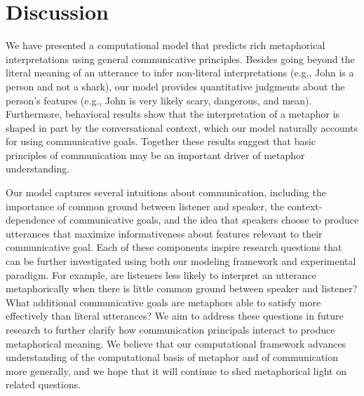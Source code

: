 \documentclass[10pt,letterpaper]{article}
\begin{document}
\section{Discussion}
We have presented a computational model that predicts rich metaphorical interpretations using general communicative principles. Besides going beyond the literal meaning of an utterance to infer non-literal interpretations (e.g., John is a person and not a shark), our model provides quantitative judgments about the person's features (e.g., John is very likely scary, dangerous, and mean). Furthermore, behavioral results show that the interpretation of a metaphor is shaped in part by the conversational context, which our model naturally accounts for using communicative goals. Together these results suggest that basic principles of communication may be an important driver of metaphor understanding.

Our model captures several intuitions about communication, including the importance of common ground between listener and speaker, the context-dependence of communicative goals, and the idea that speakers choose to produce utterances that maximize informativeness about features relevant to their communicative goal. Each of these components inspire research questions that can be further investigated using both our modeling framework and experimental paradigm. For example, are listeners less likely to interpret an utterance metaphorically when there is little common ground between speaker and listener? What additional communicative goals are metaphors able to satisfy more effectively than literal utterances? We aim to address these questions in future research to further clarify how communication principals interact to produce metaphorical meaning. We believe that our computational framework advances understanding of the computational basis of metaphor and of communication more generally, and we hope that it will continue to shed metaphorical light on related questions.






\setlength{\bibleftmargin}{.125in}
\setlength{\bibindent}{-\bibleftmargin}


\end{document}
